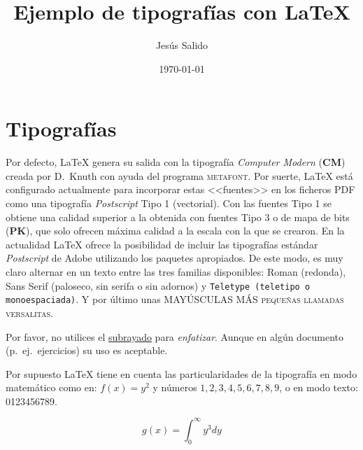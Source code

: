 \documentclass[11pt,a4paper]{article}
\title{Ejemplo de tipografías con \LaTeX}
\author{Jesús Salido}
\date{\today}
\begin{document}
\maketitle


\section{Tipografías}
Por defecto, \LaTeX{} genera su salida con la tipografía \emph{Computer Modern} (\textbf{CM}) creada por D.~Knuth con ayuda del programa 
\textsc{metafont}. Por suerte, \LaTeX{} está configurado actualmente 
para incorporar estas <<fuentes>> en los ficheros PDF como una tipografía 
\emph{Postscript} Tipo 1 (vectorial). Con las fuentes Tipo 1 se obtiene una 
calidad superior a la obtenida con fuentes Tipo 3 o de mapa de bits 
(\textbf{PK}), que solo ofrecen máxima calidad a la escala con la que se
crearon. En la actualidad \LaTeX{} ofrece la posibilidad de 
incluir las tipografías estándar \emph{Postscript} de \textsf{Adobe} utilizando los paquetes apropiados. De este modo, es muy claro alternar en un texto entre las 
tres familias disponibles: Roman (redonda), \textsf{Sans Serif (paloseco, 
sin serifa o sin adornos)} y \texttt{Teletype (teletipo o monoespaciada)}. 
Y por último unas MAYÚSCULAS MÁS \textsc{pequeñas llamadas versalitas}.

Por favor, no utilices el \underline{subrayado} para \emph{enfatizar}. Aunque en algún documento (p.~ej.\ ejercicios) su uso es aceptable.

Por supuesto \LaTeX{} tiene en cuenta las particularidades de la tipografía 
en modo matemático como en: $f(x)=y^2$ y números $1,2,3,4,5,6,7,8,9$, o en 
modo texto: 0123456789.

$$g(x)=\int_{0}^{\infty}y^{3}dy$$
\end{document}
